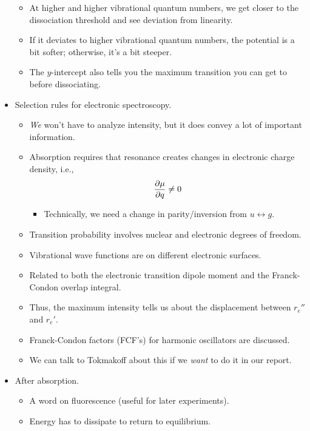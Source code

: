 \documentclass[../notes.tex]{subfiles}
\begin{document}
\begin{itemize}
    \begin{itemize}
        \item At higher and higher vibrational quantum numbers, we get closer to the dissociation threshold and see deviation from linearity.
        \item If it deviates to higher vibrational quantum numbers, the potential is a bit softer; otherwise, it's a bit steeper.
        \item The $y$-intercept also tells you the maximum transition you can get to before dissociating.
    \end{itemize}
    \item Selection rules for electronic spectroscopy.
    \begin{itemize}
        \item \emph{We} won't have to analyze intensity, but it does convey a lot of important information.
        \item Absorption requires that resonance creates changes in electronic charge density, i.e.,
        \begin{equation*}
            \pdv{\mu}{q} \neq 0
        \end{equation*}
        \begin{itemize}
            \item Technically, we need a change in parity/inversion from $u\leftrightarrow g$.
        \end{itemize}
        \item Transition probability involves nuclear and electronic degrees of freedom.
        \item Vibrational wave functions are on different electronic surfaces.
        \item Related to both the electronic transition dipole moment and the Franck-Condon overlap integral.
        \item Thus, the maximum intensity tells us about the displacement between $r_e''$ and $r_e'$.
        \item Franck-Condon factors (FCF's) for harmonic oscillators are discussed.
        \item We can talk to Tokmakoff about this if we \emph{want} to do it in our report.
    \end{itemize}
    \item After absorption.
    \begin{itemize}
        \item A word on fluorescence (useful for later experiments).
        \item Energy has to dissipate to return to equilibrium.

\end{itemize}
\end{itemize}
\end{document}
